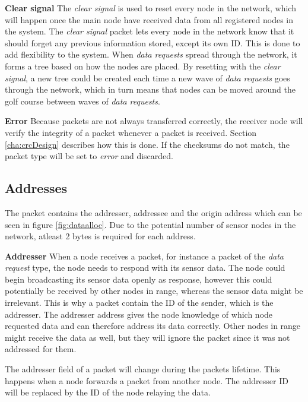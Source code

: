 \textbf{Clear signal}\newline
The \textit{clear signal} is used to reset every node in the network, which will happen once the main node have received data from all registered nodes in the system.
The \textit{clear signal} packet lets every node in the network know that it should forget any previous information stored, except its own ID. This is done to add flexibility to the system. When \textit{data requests} spread through the network, it forms a tree based on how the nodes are placed. By resetting with the \textit{clear signal}, a new tree could be created each time a new wave of \textit{data requests} goes through the network, which in turn means that nodes can be moved around the golf course between waves of \textit{data requests}.

\textbf{Error}\newline
Because packets are not always transferred correctly, the receiver node will verify the integrity of a packet whenever a packet is received. Section \ref{cha:crcDesign} describes how this is done. If the checksums do not match, the packet type will be set to \textit{error} and discarded.

\subsection{Addresses}
The packet contains the addresser, addressee and the origin address which can be seen in figure \ref{fig:dataalloc}. Due to the potential number of sensor nodes in the network, atleast 2 bytes is required for each address.

\textbf{Addresser}\newline
When a node receives a packet, for instance a packet of the \textit{data request} type, the node needs to respond with its sensor data. The node could begin broadcasting its sensor data openly as response, however this could potentially be received by other nodes in range, whereas the sensor data might be irrelevant. This is why a packet contain the ID of the sender, which is the addresser. The addresser address gives the node knowledge of which node requested data and can therefore address its data correctly. Other nodes in range might receive the data as well, but they will ignore the packet since it was not addressed for them.

The addresser field of a packet will change during the packets lifetime. This happens when a node forwards a packet from another node. The addresser ID will be replaced by the ID of the node relaying the data.

